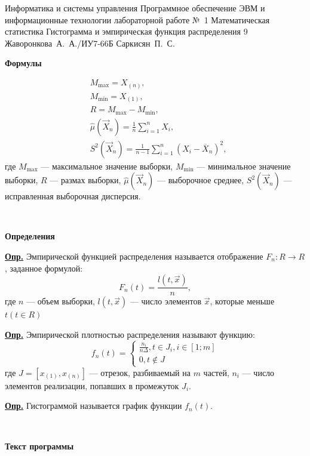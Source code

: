 \documentclass{bmstu}
\begin{document}
\makereporttitle
{Информатика и системы управления} %
{Программное обеспечение ЭВМ и информационные технологии} %
{лабораторной работе №~1} %
{Математическая статистика} %
{Гистограмма и эмпирическая функция распределения} %
{9} %
{Жаворонкова~А.~А./ИУ7-66Б} %
{Саркисян~П.~С.} %

\textbf{\LARGE{Формулы}}
~

\begin{equation}
	\begin{aligned}
		&M_{\max} = X_{(n)},\\
		&M_{\min} = X_{(1)},\\
		&R = M_{\max} - M_{\min},\\
		&\hat\mu(\vec X_n) = \frac 1n \sum_{i=1}^n X_i,\\
		&S^2(\vec X_n) = \frac 1{n-1} \sum_{i=1}^n (X_i-\overline X_n)^2,
	\end{aligned}
\end{equation}
где $M_{\max}$ --- максимальное значение выборки, 
$M_{\min}$ --- минимальное значение выборки,
$R$ --- размах выборки,
$\hat\mu(\vec X_n)$ --- выборочное среднее,
$S^2(\vec X_n)$ --- исправленная выборочная дисперсия.

~

\textbf{\LARGE{Определения}}
~

\underline{\textbf{Опр.}} Эмпирической функцией распределения называется отображение $F_n:R\rightarrow R$, заданное формулой:
$$F_n(t) = \frac{l(t, \vec{x})}{n},$$
где $n$ --- объем выборки, $l(t, \vec{x})$ --- число элементов $\vec{x}$, которые меньше $t (t \in R)$

\underline{\textbf{Опр.}} Эмпирической плотностью распределения называют функцию:
$$f_n(t) = \begin{cases}
	\frac{n_i}{n\Delta}, t \in J_i, i \in [1;m]\\
	0, t \notin J
\end{cases}$$
где $J = [x_{(1)}, x_{(n)}]$ --- отрезок, разбиваемый на $m$ частей, 
$n_{i}$ --- число элементов реализации, попавших в промежуток $J_i$.

\underline{\textbf{Опр.}} Гистограммой называется график функции $f_n(t)$.

~

\textbf{\LARGE{Текст программы}}
~
\end{document}
